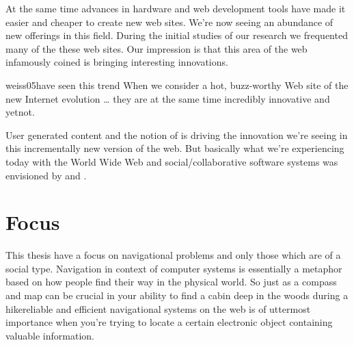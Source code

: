 At the same time advances in hardware and web development tools have made it
easier and cheaper to create new web sites. We're now seeing an
abundance of new offerings in this field.
During the initial studies of our research we frequented
many of the these web sites. Our impression is that
this area of the web infamously coined %
is bringing interesting innovations.
\begin{fullquote}[p.~18]{weiss05}{have seen this trend}
  When we consider a hot, buzz-worthy Web site of the new Internet evolution
  \ldots
  they are at the same time incredibly innovative and yet\dash{}not.
\end{fullquote}

User generated content and the notion of %
is driving the innovation we're seeing in this incrementally new version of
the web. But basically what we're experiencing today with the World Wide Web
and social/collaborative software systems was envisioned by \citet{bush45}
and \citet{licklider68}.
\section{Focus}

This thesis have a focus on navigational problems and only those
which are of a social type.%
Navigation in context of computer systems is
essentially a metaphor based on how people find their way in the physical
world. So just as a compass and map can be crucial in your ability to find a
cabin deep in the woods during a hike\dash{}reliable and efficient
navigational systems on the web is of uttermost importance when you're trying
to locate a certain electronic object containing valuable information.

